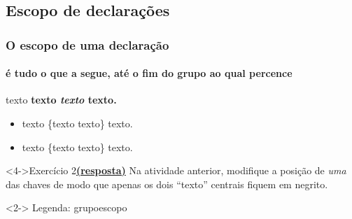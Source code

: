 \documentclass[handout,10pt]{beamer}
\newcommand{\grupo}[1]{\colorbox{red!50}{#1}}
\newcommand{\escopo}[1]{\colorbox{yellow!50}{#1}}
\begin{document}
\subsection{Escopo de declarações}
\begin{frame}[fragile]
	\frametitle{O escopo de uma declaração}
	\framesubtitle{é tudo o que a segue, até o fim do grupo ao qual percence}
	
	\begin{atividade}{3}
		\begin{LaTeXcode}
			texto \bfseries {texto \itshape texto} texto.
		\end{LaTeXcode}
	\end{atividade}\vfill
	
	\begin{itemize}
	\item<2-> \grupo{texto  \escopo{\{texto  texto\} texto.}}
	\item<3-> texto  \{\grupo{texto  \escopo{texto}}\} texto.
	\end{itemize}\vfill
	
	\begin{block}<4->{Exercício 2\hfill \hyperlink{respostas}{\footnotesize\textbf{(resposta)}}}
		Na atividade anterior, modifique a posição de \emph{uma} das chaves de modo que
		apenas os dois ``texto'' centrais fiquem em negrito.
	\end{block}\vfill
	
	\begin{uncoverenv}<2->
		\footnotesize
		Legenda: \grupo{grupo}\quad\escopo{escopo}
	\end{uncoverenv}
	
\end{frame}
\end{document}
